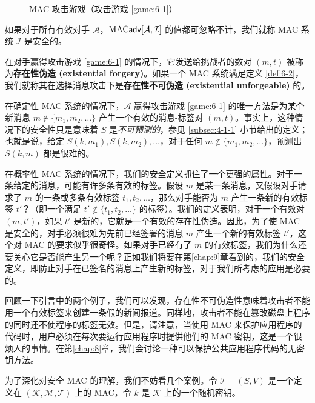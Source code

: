 \begin{figure}
  \centering
  
  \caption{MAC 攻击游戏（攻击游戏 \ref{game:6-1}）}
  \label{fig:6-2}
\end{figure}

\begin{definition}\label{def:6-2}
如果对于所有有效对手 $\mathcal{A}$，${\rm MAC}\mathsf{adv}[\mathcal{A},\mathcal{I}]$ 的值都可忽略不计，我们就称 MAC 系统 $\mathcal{I}$ 是安全的。
\end{definition}

在对手赢得攻击游戏 \ref{game:6-1} 的情况下，它发送给挑战者的数对 $(m,t)$ 被称为\textbf{存在性伪造 (existential forgery)}。如果一个 MAC 系统满足定义 \ref{def:6-2}，我们就称其在选择消息攻击下是\textbf{存在性不可伪造 (existential unforgeable)} 的。

在确定性 MAC 系统的情况下，$\mathcal{A}$ 赢得攻击游戏 \ref{game:6-1} 的唯一方法是为某个新消息 $m\notin\{m_1,m_2,\dots\}$  产生一个有效的消息-标签对 $(m,t)$。事实上，这种情况下的安全性只是意味着 $S$ 是\emph{不可预测的}，参见 \ref{subsec:4-1-1} 小节给出的定义；也就是说，给定 $S(k,m_1),S(k,m_2),\dots$，对于任何 $m\notin\{m_1,m_2,\dots\}$，预测出 $S(k,m)$ 都是很难的。

在概率性 MAC 系统的情况下，我们的安全定义抓住了一个更强的属性。对于一条给定的消息，可能有许多条有效的标签。假设 $m$ 是某一条消息，又假设对手请求了 $m$ 的一条或多条有效标签 $t_1,t_2,\dots$，那么对手能否为 $m$ 产生一条新的有效标签 $t'$？（即一个满足 $t'\notin\{t_1,t_2,\dots\}$ 的标签）。我们的定义表明，对于一个有效对 $(m,t')$，如果 $t'$ 是新的，它就是一个有效的存在性伪造。因此，为了使 MAC 是安全的，对手必须很难为先前已经签署的消息 $m$ 产生一个新的有效标签 $t'$，这个对 MAC 的要求似乎很奇怪。如果对手已经有了 $m$ 的有效标签，我们为什么还要关心它是否能产生另一个呢？正如我们将要在第\ref{chap:9}章看到的，我们的安全定义，即防止对手在已签名的消息上产生新的标签，对于我们所考虑的应用是必要的。

回顾一下引言中的两个例子，我们可以发现，存在性不可伪造性意味着攻击者不能用一个有效标签来创建一条假的新闻报道。同样地，攻击者不能在篡改磁盘上程序的同时还不使程序的标签无效。但是，请注意，当使用 MAC 来保护应用程序的代码时，用户必须在每次要运行应用程序时提供他们的 MAC 密钥，这是一个很烦人的事情。在第\ref{chap:8}章，我们会讨论一种可以保护公共应用程序代码的无密钥方法。

为了深化对安全 MAC 的理解，我们不妨看几个案例。令 $\mathcal{I}=(S,V)$ 是一个定义在 $(\mathcal{K},\mathcal{M},\mathcal{T})$ 上的 MAC，令 $k$ 是 $\mathcal{K}$ 上的一个随机密钥。

